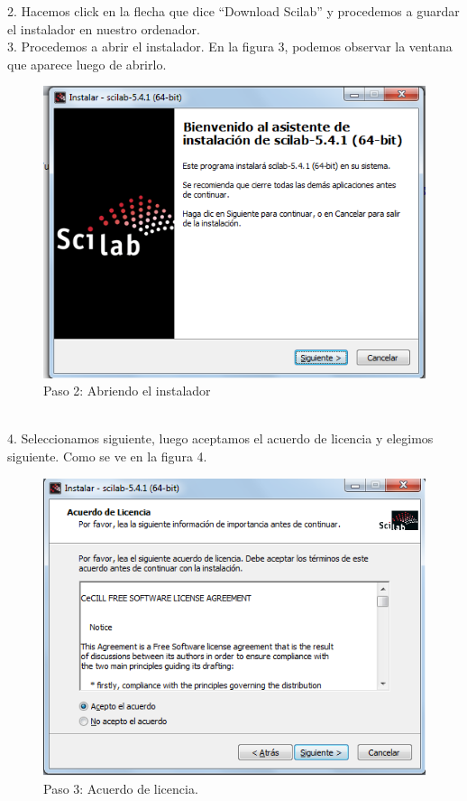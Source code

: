 \documentclass[11pt]{article} %
\begin{document}
2.	Hacemos click en la flecha que dice “Download Scilab” y procedemos a guardar el instalador en nuestro ordenador.
\\%

3.	Procedemos a abrir el instalador. En la figura 3, podemos observar la ventana que aparece luego de abrirlo.
\\%
\begin{figure}[!h]
  \centering
    \includegraphics[scale=0.5]{Captura2}
  \caption{Paso 2: Abriendo el instalador}
  \label{fig:paso2}
\end{figure}
\\%

4.	Seleccionamos siguiente, luego aceptamos el acuerdo de licencia y elegimos siguiente. Como se ve en la figura 4.
\\%
\begin{figure}[!h]
  \centering
    \includegraphics[scale=0.5]{Captura3}
  \caption{Paso 3: Acuerdo de licencia.}
  \label{fig:paso3}
\end{figure}
\\%
\end{document}
